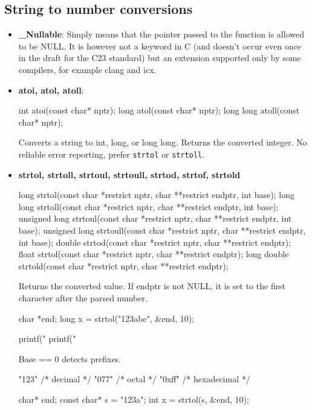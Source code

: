 \documentclass{report}
\begin{document}
    \subsection{String to number conversions}
    \begin{itemize}
        \item \textbf{\_Nullable}: Simply means that the pointer passed to the function is allowed to be NULL. It is however not a keyword in C (and doesn't occur even once in the draft for the C23 standard) but an extension supported only by some compilers, for example clang and icx.
        \item \textbf{atoi, atol, atoll}: 
            \bigbreak \noindent 
            \begin{cppcode}
            int atoi(const char* nptr);
            long atol(const char* nptr);
            long long atoll(const char* nptr);
            \end{cppcode}
            \bigbreak \noindent 
            Converts a string to int, long, or long long.
            \bigbreak \noindent 
            Returns the converted integer.
            \bigbreak \noindent 
            No reliable error reporting, prefer \texttt{strtol} or \texttt{strtoll}.
        \item \textbf{strtol, strtoll, strtoul, strtoull, strtod, strtof, strtold}
            \bigbreak \noindent 
            \begin{cppcode}
                long strtol(const char *restrict nptr, char **restrict endptr, int base);
                long long strtoll(const char *restrict nptr, char **restrict endptr, int base);
                unsigned long strtoul(const char *restrict nptr, char **restrict endptr, int base);
                unsigned long strtoull(const char *restrict nptr, char **restrict endptr, int base);
                double strtod(const char *restrict nptr, char **restrict endptr);
                float strtof(const char *restrict nptr, char **restrict endptr);
                long double strtold(const char *restrict nptr, char **restrict endptr);
            \end{cppcode}
            \bigbreak \noindent 
            Returns the converted value. If endptr is not NULL, it is set to the first character after the parsed number.
            \bigbreak \noindent 
            \begin{cppcode}
                char *end;
                long x = strtol("123abc", &end, 10);

                printf("%
                printf("%
            \end{cppcode}
            \bigbreak \noindent 
            Base == 0 detects prefixes.
            \bigbreak \noindent 
            \begin{cppcode}
                "123"   /* decimal */
                "077"   /* octal */
                "0xff"  /* hexadecimal */
            \end{cppcode}
            \bigbreak \noindent 
            \begin{cppcode}
                char* end;
                const char* s = "123a";
                int x = strtol(s, &end, 10);


\end{cppcode}
\end{itemize}
\end{document}
